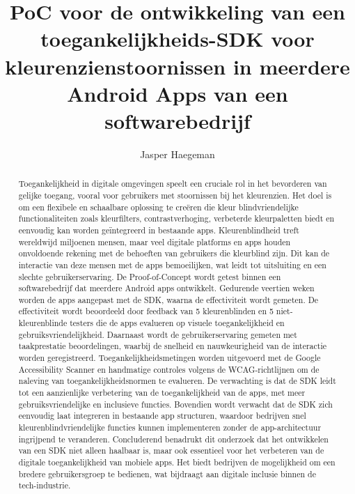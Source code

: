 \documentclass{hogent-article}
\title{PoC voor de ontwikkeling van een toegankelijkheids-SDK voor kleurenzienstoornissen in meerdere Android Apps van een softwarebedrijf}
\author{Jasper Haegeman}
\begin{document}
\begin{abstract}
 Toegankelijkheid in digitale omgevingen speelt een cruciale rol in het bevorderen van gelijke 
 toegang, vooral voor gebruikers met stoornissen bij het kleurenzien. Het doel is om een flexibele 
 en schaalbare oplossing te creëren die kleur blindvriendelijke functionaliteiten zoals kleurfilters,
 contrastverhoging, verbeterde kleurpaletten biedt en eenvoudig kan worden geïntegreerd in 
 bestaande apps. Kleurenblindheid treft wereldwijd miljoenen mensen, maar veel digitale platforms
 en apps houden onvoldoende rekening met de behoeften van gebruikers die kleurblind zijn. 
 Dit kan de interactie van deze mensen met de apps bemoeilijken, wat leidt tot uitsluiting en 
 een slechte gebruikerservaring. De Proof-of-Concept wordt getest binnen een softwarebedrijf dat 
 meerdere Android apps ontwikkelt. Gedurende veertien weken worden de apps aangepast met de SDK, 
 waarna de effectiviteit wordt gemeten. De effectiviteit wordt beoordeeld door feedback van 
 5 kleurenblinden en 5 niet-kleurenblinde testers die de apps evalueren op visuele toegankelijkheid 
 en gebruiksvriendelijkheid. Daarnaast wordt de gebruikerservaring gemeten met taakprestatie 
 beoordelingen, waarbij de snelheid en nauwkeurigheid van de interactie worden geregistreerd. 
 Toegankelijkheidsmetingen worden uitgevoerd met de Google Accessibility Scanner en handmatige 
 controles volgens de WCAG-richtlijnen om de naleving van toegankelijkheidsnormen te evalueren. 
 De verwachting is dat de SDK leidt tot een aanzienlijke verbetering van de toegankelijkheid van 
 de apps, met meer gebruiksvriendelijke en inclusieve functies. Bovendien wordt verwacht dat de 
 SDK zich eenvoudig laat integreren in bestaande app structuren, waardoor bedrijven snel 
 kleurenblindvriendelijke functies kunnen implementeren zonder de app-architectuur ingrijpend 
 te veranderen. Concluderend benadrukt dit onderzoek dat het ontwikkelen van een SDK niet alleen 
 haalbaar is, maar ook essentieel voor het verbeteren van de digitale toegankelijkheid van 
 mobiele apps. Het biedt bedrijven de mogelijkheid om een bredere gebruikersgroep te bedienen, 
 wat bijdraagt aan digitale inclusie binnen de tech-industrie.
\end{abstract}

\tableofcontents



\printbibliography[heading=bibintoc]
\end{document}
